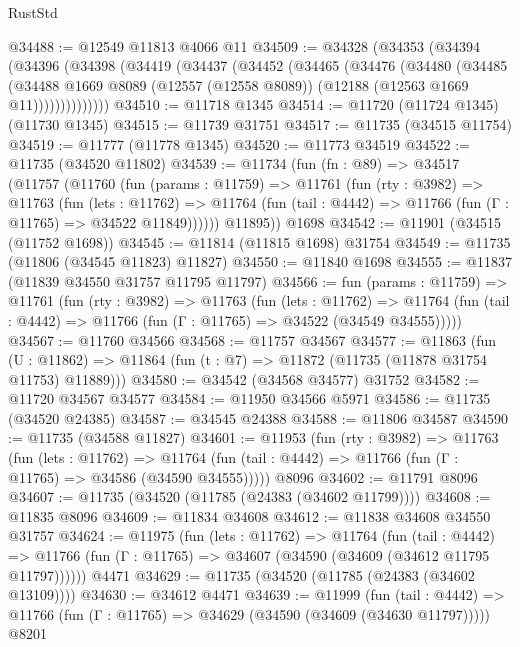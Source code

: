 \begin{lexlean}{RustStd}
\begin{coremodule}
@34488 := @12549 @11813 @4066 @11
@34509 := @34328
    (@34353
      (@34394
        (@34396
          (@34398
            (@34419
              (@34437
                (@34452
                  (@34465
                    (@34476
                      (@34480
                        (@34485
                          (@34488
                            @1669
                            @8089
                            (@12557 (@12558 @8089))
                            (@12188 (@12563 @1669 @11))))))))))))))
@34510 := @11718 @1345
@34514 := @11720 (@11724 @1345) (@11730 @1345)
@34515 := @11739 @31751
@34517 := @11735 (@34515 @11754)
@34519 := @11777 (@11778 @1345)
@34520 := @11773 @34519
@34522 := @11735 (@34520 @11802)
@34539 := @11734
    (fun (fn : @89) =>
    @34517
      (@11757
        (@11760
          (fun (params : @11759) =>
          @11761
            (fun (rty : @3982) =>
            @11763
              (fun (lets : @11762) =>
              @11764 (fun (tail : @4442) => @11766 (fun (Γ : @11765) => @34522 @11849))))))
        @11895))
    @1698
@34542 := @11901 (@34515 (@11752 @1698))
@34545 := @11814 (@11815 @1698) @31754
@34549 := @11735 (@11806 (@34545 @11823) @11827)
@34550 := @11840 @1698
@34555 := @11837 (@11839 @34550 @31757 @11795 @11797)
@34566 := fun (params : @11759) =>
  @11761
    (fun (rty : @3982) =>
    @11763
      (fun (lets : @11762) =>
      @11764 (fun (tail : @4442) => @11766 (fun (Γ : @11765) => @34522 (@34549 @34555)))))
@34567 := @11760 @34566
@34568 := @11757 @34567
@34577 := @11863
    (fun (U : @11862) => @11864 (fun (t : @7) => @11872 (@11735 (@11878 @31754 @11753) @11889)))
@34580 := @34542 (@34568 @34577) @31752
@34582 := @11720 @34567 @34577
@34584 := @11950 @34566 @5971
@34586 := @11735 (@34520 @24385)
@34587 := @34545 @24388
@34588 := @11806 @34587
@34590 := @11735 (@34588 @11827)
@34601 := @11953
    (fun (rty : @3982) =>
    @11763
      (fun (lets : @11762) =>
      @11764 (fun (tail : @4442) => @11766 (fun (Γ : @11765) => @34586 (@34590 @34555)))))
    @8096
@34602 := @11791 @8096
@34607 := @11735 (@34520 (@11785 (@24383 (@34602 @11799))))
@34608 := @11835 @8096
@34609 := @11834 @34608
@34612 := @11838 @34608 @34550 @31757
@34624 := @11975
    (fun (lets : @11762) =>
    @11764
      (fun (tail : @4442) =>
      @11766 (fun (Γ : @11765) => @34607 (@34590 (@34609 (@34612 @11795 @11797))))))
    @4471
@34629 := @11735 (@34520 (@11785 (@24383 (@34602 @13109))))
@34630 := @34612 @4471
@34639 := @11999
    (fun (tail : @4442) => @11766 (fun (Γ : @11765) => @34629 (@34590 (@34609 (@34630 @11797)))))
    @8201

\end{coremodule}
\end{lexlean}
